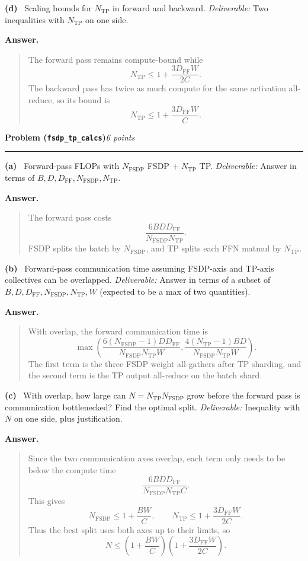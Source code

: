 \documentclass[11pt]{article}
\newcommand{\problem}[2]{%
  \vspace{0.6em}%
  \noindent\textbf{Problem (\texttt{#1})}\hfill\textit{#2 points}\par%
  \vspace{0.2em}\hrule\vspace{0.4em}%
}
\newcommand{\subq}[1]{\vspace{0.3em}\noindent\textbf{(#1)}\ }
\newcommand{\deliverable}[1]{\vspace{0.2em}\noindent\textit{Deliverable:} #1\par}
\newenvironment{answer}{%
  \vspace{0.3em}%
  \noindent\textbf{Answer.}\begin{quote}%
}{%
  \end{quote}\vspace{0.4em}%
}
\begin{document}
\subq{d} Scaling bounds for $N_{\mathrm{TP}}$ in forward and backward.
\deliverable{Two inequalities with $N_{\mathrm{TP}}$ on one side.}
\begin{answer}
  The forward pass remains compute-bound while
  \[
    N_{\mathrm{TP}} \le 1 + \frac{3 D_{\mathrm{FF}} W}{2C}.
  \]
  The backward pass has twice as much compute for the same activation all-reduce, so its bound is
  \[
    N_{\mathrm{TP}} \le 1 + \frac{3 D_{\mathrm{FF}} W}{C}.
  \]
\end{answer}


\problem{fsdp\_tp\_calcs}{6}

\subq{a} Forward-pass FLOPs with $N_{\mathrm{FSDP}}$ FSDP + $N_{\mathrm{TP}}$ TP.
\deliverable{Answer in terms of $B, D, D_{\mathrm{FF}}, N_{\mathrm{FSDP}}, N_{\mathrm{TP}}$.}
\begin{answer}
  The forward pass costs
  \[
    \frac{6 B D D_{\mathrm{FF}}}{N_{\mathrm{FSDP}} N_{\mathrm{TP}}}.
  \]
  FSDP splits the batch by \(N_{\mathrm{FSDP}}\), and TP splits each FFN matmul by \(N_{\mathrm{TP}}\).
\end{answer}

\subq{b} Forward-pass communication time assuming FSDP-axis and TP-axis collectives can be overlapped.
\deliverable{Answer in terms of a subset of $B, D, D_{\mathrm{FF}}, N_{\mathrm{FSDP}}, N_{\mathrm{TP}}, W$ (expected to be a max of two quantities).}
\begin{answer}
  With overlap, the forward communication time is
  \[
    \max\left(
      \frac{6 (N_{\mathrm{FSDP}}-1) D D_{\mathrm{FF}}}{N_{\mathrm{FSDP}} N_{\mathrm{TP}} W},
      \frac{4 (N_{\mathrm{TP}}-1) B D}{N_{\mathrm{FSDP}} N_{\mathrm{TP}} W}
    \right).
  \]
  The first term is the three FSDP weight all-gathers after TP sharding, and the second term is the TP output all-reduce on the batch shard.
\end{answer}

\subq{c} With overlap, how large can $N = N_{\mathrm{TP}} N_{\mathrm{FSDP}}$ grow before the forward pass is communication bottlenecked? Find the optimal split.
\deliverable{Inequality with $N$ on one side, plus justification.}
\begin{answer}
  Since the two communication axes overlap, each term only needs to be below the compute time
  \[
    \frac{6 B D D_{\mathrm{FF}}}{N_{\mathrm{FSDP}} N_{\mathrm{TP}} C}.
  \]
  This gives
  \[
    N_{\mathrm{FSDP}} \le 1 + \frac{B W}{C},
    \qquad
    N_{\mathrm{TP}} \le 1 + \frac{3 D_{\mathrm{FF}} W}{2C}.
  \]
  Thus the best split uses both axes up to their limits, so
  \[
    N \le
    \left(1 + \frac{B W}{C}\right)
    \left(1 + \frac{3 D_{\mathrm{FF}} W}{2C}\right).
  \]
\end{answer}
\end{document}
